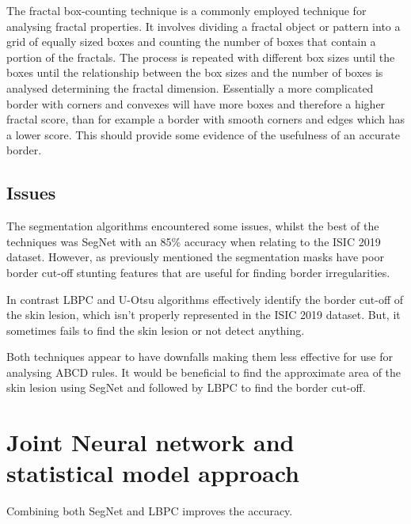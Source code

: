 The fractal box-counting technique is a commonly employed technique for analysing fractal properties. It involves dividing a fractal object or pattern into a grid of equally sized boxes and counting the number of boxes that contain a portion of the fractals. The process is repeated with different box sizes until the boxes until the relationship between the box sizes and the number of boxes is analysed determining the fractal dimension\cite{Hamburger1996}. Essentially a more complicated border with corners and convexes will have more boxes and therefore a higher fractal score, than for example a border with smooth corners and edges which has a lower score. This should provide some evidence of the usefulness of an accurate border.

\subsection{Issues}
The segmentation algorithms encountered some issues, whilst the best of the techniques was SegNet with an 85\% accuracy when relating to the ISIC 2019 dataset. However, as previously mentioned the segmentation masks have poor border cut-off stunting features that are useful for finding border irregularities. 

In contrast LBPC and U-Otsu algorithms effectively identify the border cut-off of the skin lesion, which isn't properly represented in the ISIC 2019 dataset. But, it sometimes fails to find the skin lesion or not detect anything. 

Both techniques appear to have downfalls making them less effective for use for analysing ABCD rules. It would be beneficial to find the approximate area of the skin lesion using SegNet and followed by LBPC to find the border cut-off.

\section{Joint Neural network and statistical model approach}


Combining both SegNet and LBPC improves the accuracy. 


















